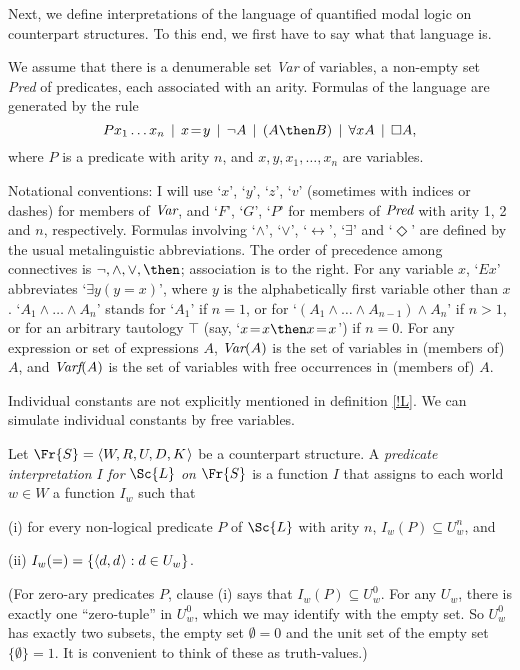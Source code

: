 \documentclass[11pt]{woarticle}
\theoremstyle{break}
\theoremstyle{nonumberplain}
\newcommand{\1}{\;\,|\;\,}
\newcommand{\verum}{\top}
\newcommand{\var}{\emph{Var}}
\newcommand{\fvar}{\emph{Varf}}
\renewcommand{\t}[1]{\ensuremath{\langle #1  \makebox[.2ex]{}\rangle}}
\begin{document}
Next, we define interpretations of the language of quantified modal logic on
counterpart structures. To this end, we first have to say what that language is.

\begin{definition}\label{!L}
  We assume that there is a denumerable set \emph{Var} of variables, a non-empty
  set \emph{Pred} of predicates, each associated with an arity. Formulas of the
  language  are generated by the rule
  \[
    Px_1\ldots x_n \1 x\!=\!y \1 \neg A \1 (A \then B) \1 \forall x A \1 \Box A,
  \]
  where $P$ is a predicate with arity $n$, and $x,y,x_1,\ldots,x_{n}$ are
  variables.
\end{definition}

Notational conventions:\label{conventions} I will use `$x$', `$y$', `$z$', `$v$'
(sometimes with indices or dashes) for members of $\emph{Var}$, and `$F$',
`$G$', `$P$' for members of $\emph{Pred}$ with arity 1, 2 and $n$, respectively.
Formulas involving `$\land$', `$\lor$', `$\leftrightarrow$', `$\exists$' and
`$\Diamond$' are defined by the usual metalinguistic abbreviations. The order of
precedence among connectives is $\neg, \land, \lor, \then$; association is to
the right. For any variable $x$, `$Ex$' abbreviates `$\exists y(y\!=\!x)$',
where $y$ is the alphabetically first variable other than $x$.
`$A_1 \land\ldots\land A_n$' stands for `$A_1$' if $n=1$, or for
`$(A_1 \land\ldots\land A_{n-1}) \land A_n$' if $n>1$, or for an arbitrary
tautology $\verum$ (say, `$x\!=\!x \then x\!=\!x$') if $n=0$. For any expression
or set of expressions $A$, $\var(A)$ is the set of variables in (members of)
$A$, and $\fvar(A)$ is the set of variables with free occurrences in (members
of) $A$.

Individual constants are not explicitly mentioned in definition \ref{!L}.
We can simulate individual constants by free variables.

\begin{definition}\label{!INT}
  Let $\Fr{S} = \t{W,R,U,D,K}$ be a counterpart structure. A \emph{predicate
    interpretation} $I$ \emph{for} $\Sc{L}$ \emph{on} $\Fr{S}$ is a function $I$
  that assigns to each world $w \in W$ a function $I_w$ such that
  \begin{compactenum}
    \item[(i)] for every non-logical predicate $P$ of $\Sc{L}$ with arity $n$,
    $I_w(P) \subseteq U_w^n$, and
  \item[(ii)] $I_w(=) = \{ \t{d,d} : d \in U_w \}$.
  \end{compactenum}
\end{definition}
\noindent%
(For zero-ary predicates $P$, clause (i) says that $I_w(P) \subseteq U_w^0$. For
any $U_w$, there is exactly one ``zero-tuple'' in $U_w^0$, which we may identify
with the empty set. So $U_w^0$ has exactly two subsets, the empty set
$\emptyset = 0$ and the unit set of the empty set $\{ \emptyset \} = 1$. It is
convenient to think of these as truth-values.)
\end{document}
